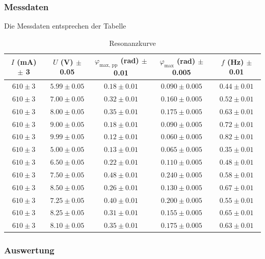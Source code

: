 \documentclass{article}
\begin{document}
\subsubsection{Messdaten}
Die Messdaten entsprechen der Tabelle
\begin{table}[!htb]
    \centering
    \begin{tabular}{|c|c|c|c|c|}
    \hline
    $I$ (mA) $\pm$ 3 & $U$ (V) $\pm$ 0.05 & $\varphi_{\text{max, pp}}$ (rad) $\pm$ 0.01 & $\varphi_{\text{max}}$ (rad) $\pm$ 0.005 & $f$ (Hz) $\pm$ 0.01 \\
    \hline
    $610 \pm 3$ & $5.99 \pm 0.05$ & $0.18 \pm 0.01$ & $0.090 \pm 0.005$ & $0.44 \pm 0.01$ \\
    $610 \pm 3$ & $7.00 \pm 0.05$ & $0.32 \pm 0.01$ & $0.160 \pm 0.005$ & $0.52 \pm 0.01$ \\
    $610 \pm 3$ & $8.00 \pm 0.05$ & $0.35 \pm 0.01$ & $0.175 \pm 0.005$ & $0.63 \pm 0.01$ \\
    $610 \pm 3$ & $9.00 \pm 0.05$ & $0.18 \pm 0.01$ & $0.090 \pm 0.005$ & $0.72 \pm 0.01$ \\
    $610 \pm 3$ & $9.99 \pm 0.05$ & $0.12 \pm 0.01$ & $0.060 \pm 0.005$ & $0.82 \pm 0.01$ \\
    $610 \pm 3$ & $5.00 \pm 0.05$ & $0.13 \pm 0.01$ & $0.065 \pm 0.005$ & $0.35 \pm 0.01$ \\
    $610 \pm 3$ & $6.50 \pm 0.05$ & $0.22 \pm 0.01$ & $0.110 \pm 0.005$ & $0.48 \pm 0.01$ \\
    $610 \pm 3$ & $7.50 \pm 0.05$ & $0.48 \pm 0.01$ & $0.240 \pm 0.005$ & $0.58 \pm 0.01$ \\
    $610 \pm 3$ & $8.50 \pm 0.05$ & $0.26 \pm 0.01$ & $0.130 \pm 0.005$ & $0.67 \pm 0.01$ \\
    $610 \pm 3$ & $7.25 \pm 0.05$ & $0.40 \pm 0.01$ & $0.200 \pm 0.005$ & $0.55 \pm 0.01$ \\
    $610 \pm 3$ & $8.25 \pm 0.05$ & $0.31 \pm 0.01$ & $0.155 \pm 0.005$ & $0.65 \pm 0.01$ \\
    $610 \pm 3$ & $8.10 \pm 0.05$ & $0.35 \pm 0.01$ & $0.175 \pm 0.005$ & $0.63 \pm 0.01$ \\
    \hline
    \end{tabular}
    \caption{Resonanzkurve}
    \label{tab:resonanzkurve}
\end{table}

\subsubsection{Auswertung}
\end{document}
